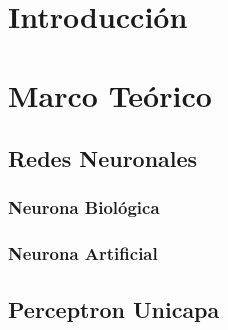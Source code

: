 \documentclass[12pt]{article}
\title{}
\begin{document}
\section{Introducción}

\section{Marco Teórico}
\subsection{Redes Neuronales}
\subsubsection{Neurona Biológica}
\subsubsection{Neurona Artificial}
\subsection{Perceptron Unicapa}
\end{document}
